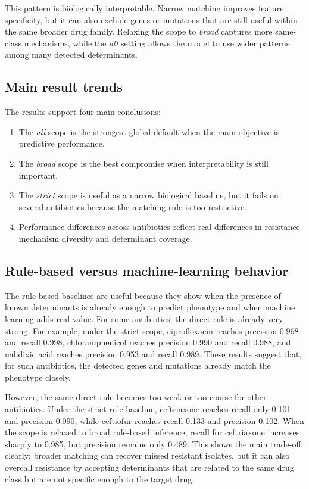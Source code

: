 This pattern is biologically interpretable. Narrow matching improves feature specificity, but it can also exclude genes or mutations that are still useful within the same broader drug family. Relaxing the scope to \textit{broad} captures more same-class mechanisms, while the \textit{all} setting allows the model to use wider patterns among many detected determinants.

\subsection{Main result trends}

The results support four main conclusions:

\begin{enumerate}[label=\arabic*.]
    \item The \textit{all} scope is the strongest global default when the main objective is predictive performance.
    \item The \textit{broad} scope is the best compromise when interpretability is still important.
    \item The \textit{strict} scope is useful as a narrow biological baseline, but it fails on several antibiotics because the matching rule is too restrictive.
    \item Performance differences across antibiotics reflect real differences in resistance mechanism diversity and determinant coverage.
\end{enumerate}

\subsection{Rule-based versus machine-learning behavior}

The rule-based baselines are useful because they show when the presence of known determinants is already enough to predict phenotype and when machine learning adds real value. For some antibiotics, the direct rule is already very strong. For example, under the strict scope, ciprofloxacin reaches precision 0.968 and recall 0.998, chloramphenicol reaches precision 0.990 and recall 0.988, and nalidixic acid reaches precision 0.953 and recall 0.989. These results suggest that, for such antibiotics, the detected genes and mutations already match the phenotype closely.

However, the same direct rule becomes too weak or too coarse for other antibiotics. Under the strict rule baseline, ceftriaxone reaches recall only 0.101 and precision 0.090, while ceftiofur reaches recall 0.133 and precision 0.102. When the scope is relaxed to broad rule-based inference, recall for ceftriaxone increases sharply to 0.985, but precision remains only 0.489. This shows the main trade-off clearly: broader matching can recover missed resistant isolates, but it can also overcall resistance by accepting determinants that are related to the same drug class but are not specific enough to the target drug.

